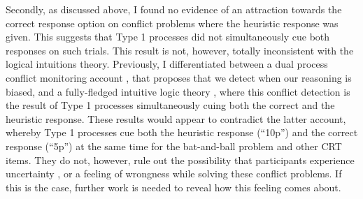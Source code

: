 Secondly, as discussed above, I found no evidence of
an attraction towards the correct response option
on conflict problems where the heuristic response was given.
This suggests that Type 1 processes did not simultaneously
cue both responses on such trials.
This result is not, however, totally inconsistent with the logical intuitions theory.
Previously, I differentiated between
a dual process conflict monitoring account \citep{DeNeys2008,DeNeys2008a},
that proposes that we detect when our reasoning is biased,
and a fully-fledged intuitive logic theory \citep{DeNeys2012,DeNeys2014a,Handley2015},
where this conflict detection is the result
of Type 1 processes simultaneously cuing
both the correct and the heuristic response.
These results would appear to contradict the latter account,
whereby Type 1 processes cue both the heuristic response (``10p'')
and the correct response (``5p'') at the same time
for the bat-and-ball problem and other CRT items.
They do not, however, rule out the possibility that
participants experience uncertainty \citep{DeNeys2013a},
or a feeling of wrongness \citep{Gangemi2015}
while solving these conflict problems.
If this is the case, further work is needed to reveal how this feeling comes about.

